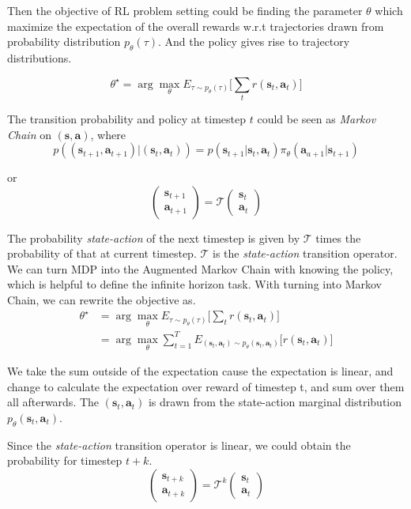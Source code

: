 \documentclass{tufte-handout}
\newcommand{\s}{\mathbf{s}}
\newcommand{\act}{\mathbf{a}}
\begin{document}
Then the objective of RL problem setting could be finding the parameter $\theta$ which maximize the expectation of the overall rewards w.r.t trajectories drawn from probability distribution $p_\theta(\tau)$. And the policy gives rise to trajectory distributions.

\[
\theta^\star = \arg \max_\theta E_{\tau \sim p_\theta(\tau) }\Big[ \sum_t r(\s_t, \act_t) \Big]
\]

The transition probability and policy at timestep $t$ could be seen as \emph{Markov Chain} on $(\s, \act)$, where
\[
p((\s_{t+1}, \act_{t+1}) | (\s_{t}, \act_t)) =
  p(\s_{t+1} | \s_t, \act_t) \pi_\theta(\act _{a+1} | \s_{t+1})
\]

or
\[
  \begin{pmatrix}
  \s_{t+1} \\ \act_{t+1}
  \end{pmatrix} = \mathcal{T}
  \begin{pmatrix}
  \s_{t} \\ \act_{t}
  \end{pmatrix}
\]

The probability \emph{state-action} of the next timestep is given by $\mathcal{T}$ times the probability of that at current timestep. $\mathcal{T}$ is the \emph{state-action} transition operator.
We can turn MDP into the Augmented Markov Chain with knowing the policy, which is helpful to define the infinite horizon task. With turning into Markov Chain, we can rewrite the objective as.
\begin{align*}
\theta^\star & = \arg \max_\theta E_{\tau \sim p_\theta(\tau) }\Big[ \sum_t r(\s_t, \act_t) \Big] \\
            & = \arg \max_\theta \sum_{t=1} ^ T E_{(\s_t, \act_t)\sim p_\theta (\s_t, \act_t)} \big[r(\s_t, \act_t) \big]
\end{align*}


We take the sum outside of the expectation cause the expectation is linear, and change to calculate the expectation over reward of timestep t, and sum over them all afterwards. The $(\s_t, \act_t)$ is drawn from the state-action marginal distribution $p_\theta (\s_t, \act_t)$.

Since the \emph{state-action} transition operator is linear, we could obtain the probability for timestep $t+k$.
\[
  \begin{pmatrix}
  \s_{t+k} \\ \act_{t+k}
  \end{pmatrix} = \mathcal{T}^k
  \begin{pmatrix}
  \s_{t} \\ \act_{t}
  \end{pmatrix}
\]
\end{document}
